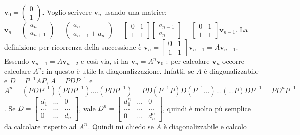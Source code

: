 \documentclass{article}
\begin{document}
\begin{enumerate}
$\mathbf{v}_{0}=\left( 
\begin{array}{c}
0 \\ 
1%
\end{array}%
\right) $. Voglio scrivere $\mathbf{v}_{n}$ usando una matrice: $\mathbf{v}%
_{n}=\left( 
\begin{array}{c}
a_{n} \\ 
a_{n+1}%
\end{array}%
\right) =\left( 
\begin{array}{c}
a_{n} \\ 
a_{n-1}+a_{n}%
\end{array}%
\right) =\left[ 
\begin{array}{cc}
0 & 1 \\ 
1 & 1%
\end{array}%
\right] \left[ 
\begin{array}{c}
a_{n-1} \\ 
a_{n}%
\end{array}%
\right] =\left[ 
\begin{array}{cc}
0 & 1 \\ 
1 & 1%
\end{array}%
\right] \mathbf{v}_{n-1}$. La definizione per ricorrenza della successione 
\`{e} $\mathbf{v}_{n}=\left[ 
\begin{array}{cc}
0 & 1 \\ 
1 & 1%
\end{array}%
\right] \mathbf{v}_{n-1}=A\mathbf{v}_{n-1}$. Essendo $\mathbf{v}_{n-1}=A%
\mathbf{v}_{n-2}$ e cos\`{\i} via, si ha $\mathbf{v}_{n}=A^{n}\mathbf{v}_{0}$%
: per calcolare $\mathbf{v}_{n}$ occorre calcolare $A^{n}$: in questo \`{e}
utile la diagonalizzazione. Infatti, se $A$ \`{e} diagonalizzabile e $%
D=P^{-1}AP$, $A=PDP^{-1}$ e $A^{n}=\left( PDP^{-1}\right) \left(
PDP^{-1}\right) ....\left( PDP^{-1}\right) =PD\left( P^{-1}P\right) D\left(
P^{-1}...\right) ...\left( ...P\right) DP^{-1}=PD^{n}P^{-1}$. Se $D=\left[ 
\begin{array}{ccc}
d_{1} & ... & 0 \\ 
... & ... & ... \\ 
0 & ... & d_{n}%
\end{array}%
\right] $, vale $D^{n}=\left[ 
\begin{array}{ccc}
d_{1}^{n} & ... & 0 \\ 
... & ... & ... \\ 
0 & ... & d_{n}^{n}%
\end{array}%
\right] $, quindi \`{e} molto p\`{u} semplice da calcolare rispetto ad $%
A^{n} $. Quindi mi chiedo se $A$ \`{e} diagonalizzabile e calcolo

\end{enumerate}
\end{document}
